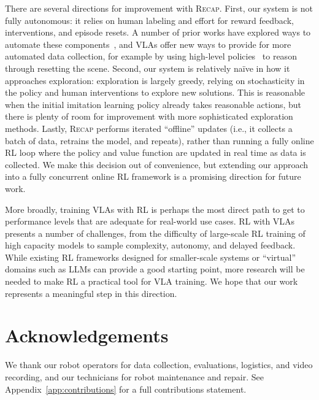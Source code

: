 \documentclass[conference]{IEEEtran}
\def \MethodName {\textsc{Recap}}
\begin{document}
There are several directions for improvement with \MethodName{}. First, our system is not fully autonomous: it relies on human labeling and effort for reward feedback, interventions, and episode resets. A number of prior works have explored ways to automate these components~\citep{zhu2020ingredients,sharma2021autonomous}, and VLAs offer new ways to provide for more automated data collection, for example by using high-level policies~\citep{shi2025hi} to reason through resetting the scene. Second, our system is relatively na\"{i}ve in how it approaches exploration: exploration is largely greedy, relying on stochasticity in the policy and human interventions to explore new solutions. This is reasonable when the initial imitation learning policy already takes reasonable actions, but there is plenty of room for improvement with more sophisticated exploration methods. Lastly, \MethodName{} performs iterated ``offline'' updates (i.e., it collects a batch of data, retrains the model, and repeats), rather than running a fully online RL loop where the policy and value function are updated in real time as data is collected. We make this decision out of convenience, but extending our approach into a fully concurrent online RL framework is a promising direction for future work.

More broadly, training VLAs with RL is perhaps the most direct path to get to performance levels that are adequate for real-world use cases. RL with VLAs presents a number of challenges, from the difficulty of large-scale RL training of high capacity models to sample complexity, autonomy, and delayed feedback. While existing RL frameworks designed for smaller-scale systems or ``virtual'' domains such as LLMs can provide a good starting point, more research will be needed to make RL a practical tool for VLA training. We hope that our work represents a meaningful step in this direction.

\section*{Acknowledgements}

We thank our robot operators for data collection, evaluations, logistics, and video recording, and our technicians for robot maintenance and repair. See Appendix~\ref{app:contributions} for a full contributions statement.




\appendix

\section{}
\end{document}
